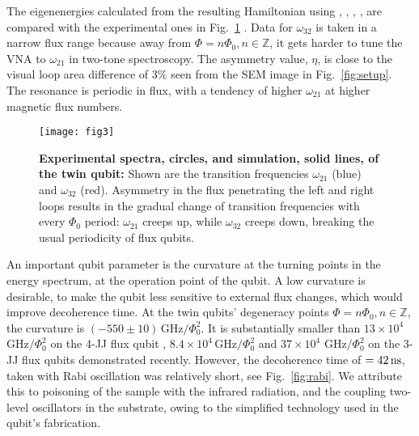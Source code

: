 \noindent  The eigenenergies  calculated from  the  resulting Hamiltonian  using , , , , are compared
with the experimental ones  in Fig.~\ref{fig:experiment} .  Data for $ \omega_{32} $  is taken in a
narrow flux range  because away from $ \Phi =  n \Phi_0, n\in\mathbb{Z} $, it gets  harder to tune the
VNA to  $ \omega_{21} $  in two-tone spectroscopy.   The asymmetry  value, $ \eta  $, is close  to the
visual loop  area difference  of 3\%  seen from  the SEM  image in  Fig.~\ref{fig:setup}.  The
resonance is  periodic in flux,  with a  tendency of higher  $\omega_{21}$ at higher  magnetic flux
numbers.

\begin{figure}[h]
  \texttt{[image: fig3]}
  \caption{\small \textbf{Experimental spectra,  circles, and simulation, solid  lines, of the
      twin   qubit:}  Shown   are  the   transition  frequencies   $  \omega_{21}   $  (blue)   and
    $ \omega_{32}$ (red).   Asymmetry in the flux  penetrating the left and right  loops results in
    the gradual change of transition frequencies with  every $ \Phi_{0} $ period: $\omega_{21}$ creeps
    up,   while   $\omega_{32}$   creeps   down,   breaking   the   usual   periodicity   of   flux
    qubits.  \label{fig:experiment}}
\end{figure}
 
An important qubit parameter is the curvature at the turning points in the energy spectrum, at
the operation  point of  the qubit.   A low  curvature is  desirable, to  make the  qubit less
sensitive to external flux changes, which would improve decoherence time.  At the twin qubits'
degeneracy    points    $     \Phi    =    n\Phi_0,    n\in\mathbb{Z}    $,     the    curvature    is
$  (-550\pm10)\,\text{GHz}/\Phi_0^2   $.   It   is  substantially  smaller   than  $   13\times  10^4$
$      \text{GHz}/\Phi_0^2$      on      the     4-JJ      flux      qubit      \cite{stern2014},
$    8.4    \times     10^4\,    \text{GHz}/\Phi_0^2$    \cite{zhu2010}    and     $    37\times    10^{4}$
$  \text{GHz}/\Phi_0^2$ \cite{gustavsson2012}  on  the 3-JJ  flux  qubits demonstrated  recently.
However,  the  decoherence  time  of  $  =  42\,\text{ns}  $,  taken  with  Rabi  oscillation
\cite{Bylander2011,Ithier2005,Martinis2003} was relatively short, see Fig.~\ref{fig:rabi}.  We
attribute  this to  poisoning of  the sample  with the  infrared radiation,  and the  coupling
two-level oscillators in the substrate, owing to the simplified technology used in the qubit's
fabrication.

